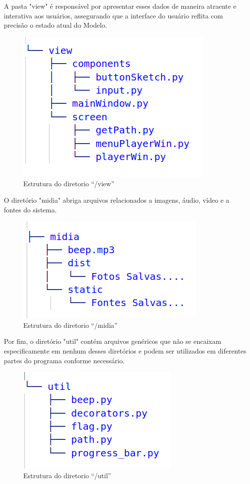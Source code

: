 A pasta "view" é responsável por apresentar esses dados de maneira atraente e interativa aos usuários, assegurando que a interface do usuário reflita com precisão o estado atual do Modelo.

\begin{figure}[!htb]
	\centering
	\includegraphics[scale=0.5]{figuras/diretorios/view.png}
	\caption{Estrutura do diretorio ``/view''}
	\label{fig:view}
\end{figure}


O diretório "midia" abriga arquivos relacionados a imagens, áudio, vídeo e a fontes do sistema. 
\begin{figure}[!htb]
	\centering
	\includegraphics[scale=0.5]{figuras/diretorios/midia.png}
	\caption{Estrutura do diretorio ``/midia''}
	\label{fig:midia}
\end{figure}

Por fim, o diretório "util" contém arquivos genéricos que não se encaixam especificamente em nenhum desses diretórios e podem ser utilizados em diferentes partes do programa conforme necessário.

\begin{figure}[!htb]
	\centering
	\includegraphics[scale=0.5]{figuras/diretorios/util.png}
	\caption{Estrutura do diretorio ``/util''}
	\label{fig:util}
\end{figure}
\newpage


